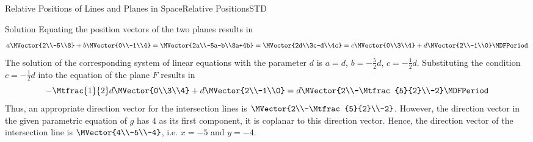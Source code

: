 \begin{MXContent}{Relative Positions of Lines and Planes in Space}{Relative Positions}{STD}
\begin{MExercise}
\begin{MHint}{Solution}
Equating the position vectors of the two planes results in 
\[
 a\MVector{2\\-5\\8}+b\MVector{0\\-1\\4}=\MVector{2a\\-5a-b\\8a+4b}=\MVector{2d\\3c-d\\4c}=c\MVector{0\\3\\4}+d\MVector{2\\-1\\0} \MDFPeriod
\]
The solution of the corresponding system of linear equations with the parameter $d$ is $a=d$, $b=-\frac{5}{2}d$, 
$c=-\frac{1}{2}d$. Substituting the condition $c=-\frac{1}{2}d$ into the equation of the plane $F$ results in 
\[
 -\Mtfrac{1}{2}d\MVector{0\\3\\4}+d\MVector{2\\-1\\0}=d\MVector{2\\-\Mtfrac{5}{2}\\-2} \MDFPeriod
\]
Thus, an appropriate direction vector for the intersection lines is $\MVector{2\\-\Mtfrac{5}{2}\\-2}$.
However, the direction vector in the given parametric equation of $g$ has $4$ as its first component,
it is coplanar to this direction vector. Hence, the direction vector of the intersection line 
is $\MVector{4\\-5\\-4}$, i.e. $x=-5$ and $y=-4$.
\end{MHint}


\end{MExercise}

\end{MXContent}



